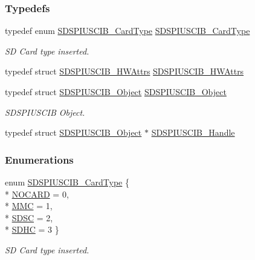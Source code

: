 \subsubsection*{Typedefs}
\begin{DoxyCompactItemize}
\item 
typedef enum \hyperlink{_s_d_s_p_i_u_s_c_i_b_8h_a82051f5c4a349b60bc2205ec32cd74c1}{S\-D\-S\-P\-I\-U\-S\-C\-I\-B\-\_\-\-Card\-Type} \hyperlink{_s_d_s_p_i_u_s_c_i_b_8h_a802d35208b5fda397e7de76e62db1b7c}{S\-D\-S\-P\-I\-U\-S\-C\-I\-B\-\_\-\-Card\-Type}
\begin{DoxyCompactList}\small\item\em S\-D Card type inserted. \end{DoxyCompactList}\item 
typedef struct \hyperlink{struct_s_d_s_p_i_u_s_c_i_b___h_w_attrs}{S\-D\-S\-P\-I\-U\-S\-C\-I\-B\-\_\-\-H\-W\-Attrs} \hyperlink{_s_d_s_p_i_u_s_c_i_b_8h_ae05ce574f2adf5c1baf1ae53c2824576}{S\-D\-S\-P\-I\-U\-S\-C\-I\-B\-\_\-\-H\-W\-Attrs}
\item 
typedef struct \hyperlink{struct_s_d_s_p_i_u_s_c_i_b___object}{S\-D\-S\-P\-I\-U\-S\-C\-I\-B\-\_\-\-Object} \hyperlink{_s_d_s_p_i_u_s_c_i_b_8h_ad59c8528a1b9ee05380131ed4448044c}{S\-D\-S\-P\-I\-U\-S\-C\-I\-B\-\_\-\-Object}
\begin{DoxyCompactList}\small\item\em S\-D\-S\-P\-I\-U\-S\-C\-I\-B Object. \end{DoxyCompactList}\item 
typedef struct \hyperlink{struct_s_d_s_p_i_u_s_c_i_b___object}{S\-D\-S\-P\-I\-U\-S\-C\-I\-B\-\_\-\-Object} $\ast$ \hyperlink{_s_d_s_p_i_u_s_c_i_b_8h_ac3caea6a7328f588f8d4a05e365a66aa}{S\-D\-S\-P\-I\-U\-S\-C\-I\-B\-\_\-\-Handle}
\end{DoxyCompactItemize}
\subsubsection*{Enumerations}
\begin{DoxyCompactItemize}
\item 
enum \hyperlink{_s_d_s_p_i_u_s_c_i_b_8h_a82051f5c4a349b60bc2205ec32cd74c1}{S\-D\-S\-P\-I\-U\-S\-C\-I\-B\-\_\-\-Card\-Type} \{ \\*
\hyperlink{_s_d_s_p_i_u_s_c_i_b_8h_a82051f5c4a349b60bc2205ec32cd74c1a422cdc20ba86c8cdcf1f0fd2318a1cfc}{N\-O\-C\-A\-R\-D} = 0, 
\\*
\hyperlink{_s_d_s_p_i_u_s_c_i_b_8h_a82051f5c4a349b60bc2205ec32cd74c1aa7d8fca3406f36682514f0384d910fac}{M\-M\-C} = 1, 
\\*
\hyperlink{_s_d_s_p_i_u_s_c_i_b_8h_a82051f5c4a349b60bc2205ec32cd74c1a87550a2102744c14e5e2e0ed39cc04b2}{S\-D\-S\-C} = 2, 
\\*
\hyperlink{_s_d_s_p_i_u_s_c_i_b_8h_a82051f5c4a349b60bc2205ec32cd74c1ab27db2a19a825c3e6f1513cdab7c81ea}{S\-D\-H\-C} = 3
 \}
\begin{DoxyCompactList}\small\item\em S\-D Card type inserted. \end{DoxyCompactList}\end{DoxyCompactItemize}
